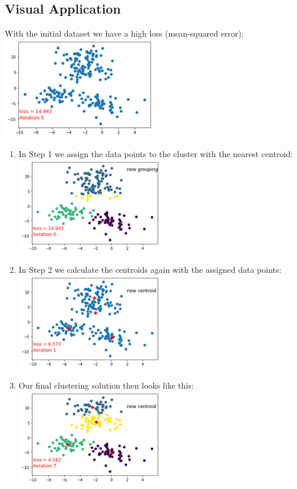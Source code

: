 \documentclass[12pt, a4paper]{article}
\begin{document}
\begin{flushleft}
\begin{flushleft}
        \subsection{Visual Application}
        \begin{flushleft}
                With the initial dataset we have a high loss (mean-squared error):
                \includegraphics[width=0.5\textwidth,center]{example1.png}
            \begin{enumerate}
                \item In Step 1 we assign the data points to the cluster with the nearest centroid:
                \includegraphics[width=0.5\textwidth,center]{images/example2.png}
                
                \item In Step 2 we calculate the centroids again with the assigned data points:
                \includegraphics[width=0.5\textwidth,center]{example3.png}

                \item Our final clustering solution then looks like this:
                \includegraphics[width=0.5\textwidth,center]{example5.png}


\end{enumerate}
\end{flushleft}
\end{flushleft}
\end{flushleft}
\end{document}
